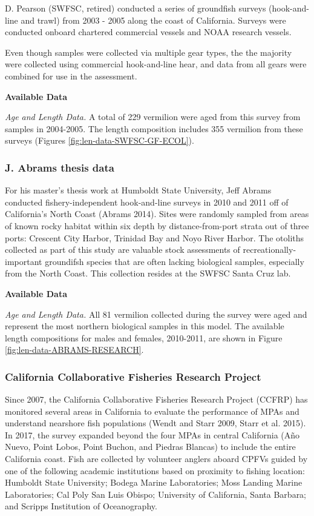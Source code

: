 \documentclass[
  english,
  a4paper,
]{article}
\begin{document}
D. Pearson (SWFSC, retired) conducted a series of groundfish surveys (hook-and-line and
trawl) from 2003 - 2005 along the coast of California. Surveys were conducted onboard
chartered commercial vessels and NOAA research vessels.

Even though samples were collected via multiple gear types, the the majority were collected using commercial hook-and-line hear, and data from all gears were combined for use
in the assessment.

\textbf{Available Data}

\emph{Age and Length Data.}
A total of 229 vermilion were aged from this survey from samples in 2004-2005.
The length composition includes 355 vermilion from these surveys
(Figures \ref{fig:len-data-SWFSC-GF-ECOL}).

\hypertarget{j.-abrams-thesis-data}{%
\subsubsection{J. Abrams thesis data}\label{j.-abrams-thesis-data}}

For his master's thesis work at Humboldt State University, Jeff Abrams conducted fishery-independent
hook-and-line surveys in 2010 and 2011 off of California's North Coast (Abrams 2014). Sites were randomly sampled from
areas of known rocky habitat within six depth by distance-from-port strata out of three ports:
Crescent City Harbor, Trinidad Bay and Noyo River Harbor. The otoliths collected as part of this
study are valuable stock assessments of recreationally-important groundifsh species that are often lacking biological samples,
especially from the North Coast. This collection resides at the SWFSC Santa Cruz lab.

\textbf{Available Data}

\emph{Age and Length Data.}
All 81 vermilion collected during the survey were aged and represent the most northern biological
samples in this model. The available length compositions for males and females, 2010-2011, are shown in Figure
\ref{fig:len-data-ABRAMS-RESEARCH}.

\hypertarget{california-collaborative-fisheries-research-project}{%
\subsubsection{California Collaborative Fisheries Research Project}\label{california-collaborative-fisheries-research-project}}

Since 2007, the California Collaborative Fisheries Research Project (CCFRP)
has monitored several areas in California to
evaluate the performance of MPAs and understand nearshore fish populations
(Wendt and Starr 2009, Starr et al. 2015). In 2017, the survey expanded beyond the four
MPAs in central California
(Año Nuevo, Point Lobos, Point Buchon, and Piedras Blancas)
to include the entire California coast.
Fish are collected by volunteer anglers aboard CPFVs guided by one of
the following academic institutions based on proximity to fishing location:
Humboldt State University;
Bodega Marine Laboratories;
Moss Landing Marine Laboratories;
Cal Poly San Luis Obispo;
University of California, Santa Barbara; and
Scripps Institution of Oceanography.
\end{document}
